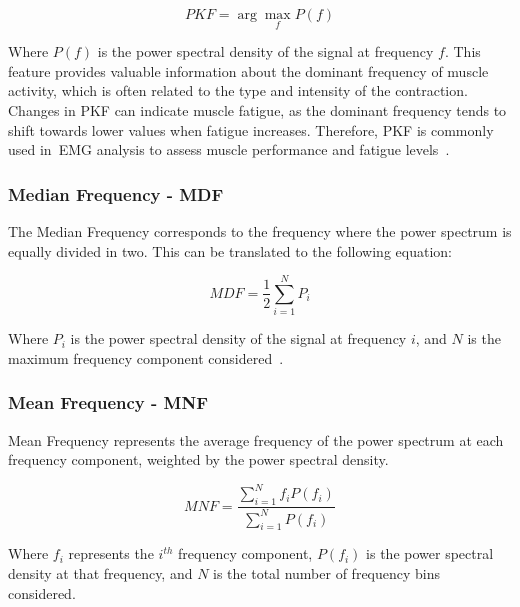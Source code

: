 \begin{equation}
  PKF = \arg\max_f P(f)
  \label{eq:pkfEQ}
\end{equation}

Where $P(f)$ is the power spectral density of the signal at frequency $f$.
This feature provides valuable information about the dominant frequency of muscle activity, which is often related to the type and intensity of the contraction. Changes in PKF 
can indicate muscle fatigue, as the dominant frequency tends to shift towards lower values when fatigue increases. Therefore, PKF is commonly used in~\gls{EMG} analysis to assess 
muscle performance and fatigue levels~\cite{HandGestureRecognition, Review_IRBM_EMG}.

\subsubsection{Median Frequency - MDF} 
\label{sssec:median_frequency}

The Median Frequency corresponds to the frequency where the power spectrum is equally divided in two. This can be translated to the following equation:

\begin{equation}
  MDF = \frac{1}{2}\sum_{i = 1}^{N} P_i
  \label{eq:mdfEQ}
\end{equation}

Where $P_i$ is the power spectral density of the signal at frequency $i$, and $N$ is the maximum frequency component considered~\cite{HandGestureRecognition, Review_IRBM_EMG, 
ReviewOfEMGSignalClassification, ComprehensiveStudyOnEMG}.


\subsubsection{Mean Frequency - MNF} 
\label{sssec:mean_frequency}

Mean Frequency represents the average frequency of the power spectrum at each frequency component, weighted by the power spectral density.

\begin{equation}
  MNF = \frac{\sum_{i = 1}^{N} f_i P(f_i)}{\sum_{i = 1}^{N} P(f_i)}
  \label{eq:mnfEQ}
\end{equation}

Where $f_i$ represents the $i^{th}$ frequency component, $P(f_i)$ is the power spectral density at that frequency, and $N$ is the total number of frequency bins considered.

